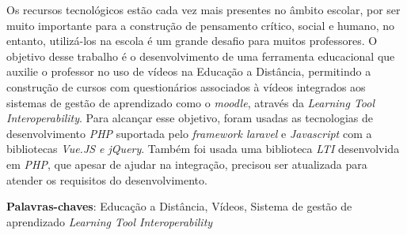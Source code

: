 \begin{resumo}
Os recursos tecnológicos estão cada vez mais presentes no âmbito escolar, por ser muito importante para a construção de pensamento crítico, social e humano, no entanto, utilizá-los na escola é um grande desafio para muitos professores. O objetivo desse trabalho é o desenvolvimento de uma ferramenta educacional que auxilie o professor no uso de vídeos na Educação a Distância, permitindo a construção de cursos com questionários associados à vídeos integrados aos sistemas de gestão de aprendizado como o \textit{moodle}, através da \textit{Learning Tool Interoperability}. Para alcançar esse objetivo, foram usadas as tecnologias de desenvolvimento \textit{PHP} suportada pelo \textit{framework laravel} e \textit{Javascript} com a bibliotecas \textit{Vue.JS e jQuery}. Também foi usada uma biblioteca \textit{LTI} desenvolvida em \textit{PHP}, que apesar de ajudar na integração, precisou ser atualizada para atender os requisitos do desenvolvimento.

 \vspace{\onelineskip}
    
 \noindent
 \textbf{Palavras-chaves}: Educação a Distância, Vídeos, Sistema de gestão de aprendizado \textit{Learning Tool Interoperability}
\end{resumo}
